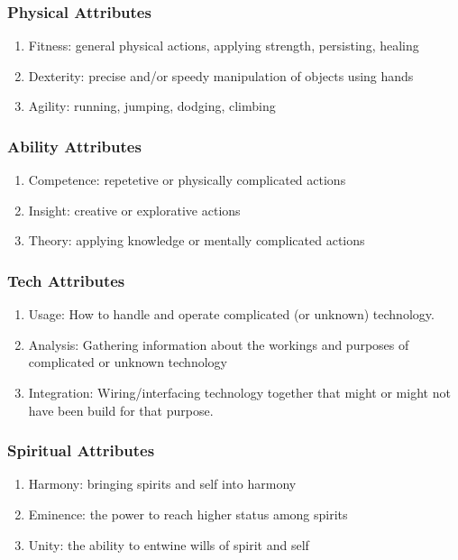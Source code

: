     \subsubsection{Physical Attributes} 
        \begin{enumerate}[label= -]
            \item {Fitness}: general physical actions, applying strength, persisting, healing
            \item {Dexterity}: precise and/or speedy manipulation of objects using hands
            \item {Agility}: running, jumping, dodging, climbing
        \end{enumerate}
    \subsubsection{Ability Attributes}
        \begin{enumerate}[label= -]
            \item {Competence}: repetetive or physically complicated actions
            \item {Insight}: creative or explorative actions
            \item {Theory}: applying knowledge or mentally complicated actions
        \end{enumerate}
    \subsubsection{Tech Attributes}
        \begin{enumerate}[label= -]
            \item {Usage}: How to handle and operate complicated (or unknown) technology.
            \item {Analysis}: Gathering information about the workings and purposes of complicated or unknown technology
            \item {Integration}: Wiring/interfacing technology together that might or might not have been build for
            that purpose.
        \end{enumerate}
    \subsubsection{Spiritual Attributes}
        \begin{enumerate}[label= -]
            \item {Harmony}: bringing spirits and self into harmony
            \item {Eminence}: the power to reach higher status among spirits
            \item {Unity}: the ability to entwine wills of spirit and self
        \end{enumerate}
